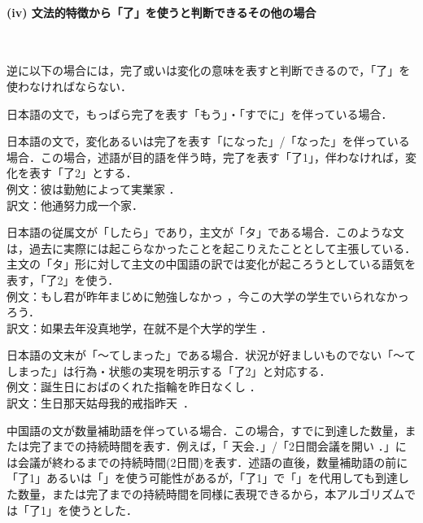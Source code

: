 \paragraph{(iv) 文法的特徴から「了」を使うと判断できるその他の場合}　

逆に以下の場合には，完了或いは変化の意味を表すと判断できるので，「了」を使わなければならない．
\begin{enumerater}
\renewcommand{\labelenumi}{}
\renewcommand{\theenumi}{}
\item 日本語の文で，もっぱら完了を表す「もう」・「すでに」を伴っている場合．
\item 日本語の文で，変化あるいは完了を表す「になった」/「なった」を伴っている場合．この場合，述語が目的語を伴う時，完了を表す「了1」，伴わなければ，変化を表す「了2」とする．\\例文：彼は勤勉によって実業家 ．\\訳文：他通努力成一个家．
\item 日本語の従属文が「したら」であり，主文が「タ」である場合．このような文は，過去に実際には起こらなかったことを起こりえたこととして主張している．主文の「タ」形に対して主文の中国語の訳では変化が起ころうとしている語気を表す，「了2」を使う．\\例文：もし君が昨年まじめに勉強しなかっ ，今この大学の学生でいられなかっろう．\\訳文：如果去年没真地学，在就不是个大学的学生 ．
\item 日本語の文末が「〜てしまった」である場合．状況が好ましいものでない「〜てしまった」は行為・状態の実現を明示する「了2」と対応する．\\例文：誕生日におばのくれた指輪を昨日なくし ．\\訳文：生日那天姑母我的戒指昨天\, ．
\item 中国語の文が数量補助語を伴っている場合．この場合，すでに到達した数量，または完了までの持続時間を表す．例えば，「\,\,天会．」/「2日間会議を開い ．」には会議が終わるまでの持続時間(2日間)を表す．述語の直後，数量補助語の前に「了1」あるいは「」を使う可能性があるが，「了1」で「」を代用しても到達した数量，または完了までの持続時間を同様に表現できるから，本アルゴリズムでは「了1」を使うとした．
\end{enumerater}


